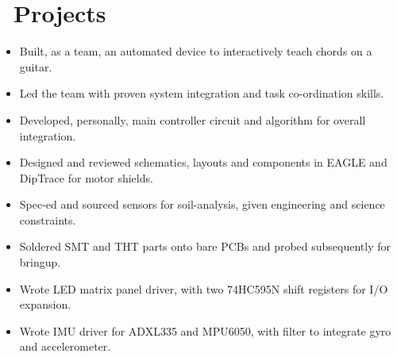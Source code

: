 \documentclass{resume}
\begin{document}
\section{\faFlask\ Projects}

\begin{itemize}
  \item Built, as a team, an automated device to interactively teach chords on a guitar.
  \item Led the team with proven system integration and task co-ordination skills.
  \item Developed, personally, main controller circuit and algorithm for overall integration.
\end{itemize}

\begin{itemize}
  \item Designed and reviewed schematics, layouts and components in EAGLE and DipTrace for motor shields. %
  \item Spec-ed and sourced sensors for soil-analysis, given engineering and science constraints.
  \item Soldered SMT and THT parts onto bare PCBs and probed subsequently for bringup.
\end{itemize}

\begin{itemize}
  \item Wrote LED matrix panel driver, with two 74HC595N shift registers for I/O expansion.
  \item Wrote IMU driver for ADXL335 and MPU6050, with filter to integrate gyro and accelerometer.
\end{itemize}

\end{document}
